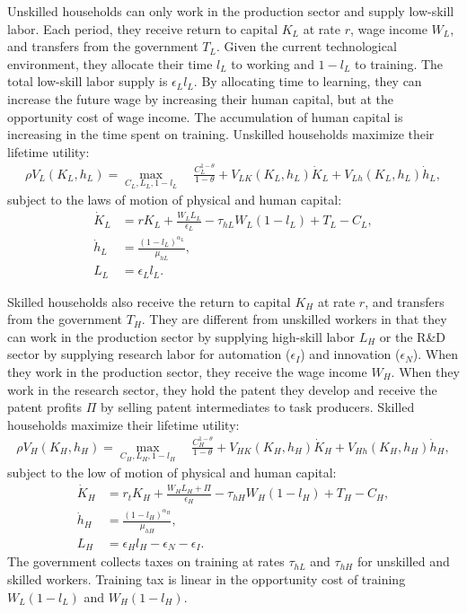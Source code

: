 \documentclass[12pt]{article}
\begin{document}
Unskilled households can only work in the production sector and supply low-skill labor. Each period, they receive return to capital $K_L$ at rate $r$, wage income $W_L$, and transfers from the government $T_L$. Given the current technological environment, they allocate their time $l_L$ to working and $1-l_L$ to training. The total low-skill labor supply is $\epsilon_Ll_L$. By allocating time to learning, they can increase the future wage by increasing their human capital, but at the opportunity cost of wage income. The accumulation of human capital is increasing in the time spent on training. Unskilled households maximize their lifetime utility: 
\begin{align*}
\rho V_L(K_L,h_L) = \max_{C_L,L_L,1-l_L} \quad \frac{C_L^{1-\theta}}{1-\theta}+V_{LK}(K_L,h_L)\dot{K}_L+V_{Lh}(K_L,h_L)\dot{h}_L,
\end{align*}
subject to the laws of motion of physical and human capital: 
\begin{align*}
\dot{K}_L &=r K_L+\frac{W_LL_L}{\epsilon_L}-\tau_{hL}W_L(1-l_L)+T_L-C_L, \\
\dot{h}_L &= \frac{(1-l_L)^{\alpha_L}}{\mu_{hL}}, \\
L_L &=\epsilon_L l_L.
\end{align*}

Skilled households also receive the return to capital $K_H$ at rate $r$, and transfers from the government $T_H$. They are different from unskilled workers in that they can work in the production sector by supplying high-skill labor $L_H$ or the R\&D sector by supplying research labor for automation ($\epsilon_I$) and innovation ($\epsilon_N$). When they work in the production sector, they receive the wage income $W_H$. When they work in the research sector, they hold the patent they develop and receive the patent profits $\Pi$ by selling patent intermediates to task producers. Skilled households maximize their lifetime utility: 
\begin{align*}
\rho V_H(K_H,h_H) = \max_{C_H,L_H,1-l_H} \quad \frac{C_H^{1-\theta}}{1-\theta}+V_{HK}(K_H,h_H)\dot{K}_H+V_{Hh}(K_H,h_H)\dot{h}_H,
\end{align*}
subject to the low of motion of physical and human capital: 
\begin{align*}
\dot{K}_H &= r_t K_H +\frac{W_H L_H+\Pi}{\epsilon_H}-\tau_{hH}W_H(1-l_H)+T_H-C_H, \\
\dot{h}_H &= \frac{(1-l_H)^{\alpha_H}}{\mu_{hH}}, \\
 L_H&=\epsilon_H l_H-\epsilon_N-\epsilon_I.
\end{align*}
The government collects taxes on training at rates $\tau_{hL}$ and $\tau_{hH}$ for unskilled and skilled workers. Training tax is linear in the opportunity cost of training $W_L(1-l_L)$ and $W_H(1-l_H)$. 
\end{document}
